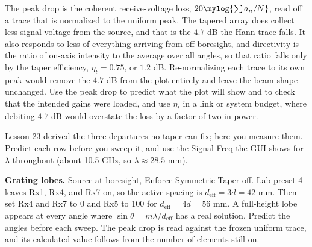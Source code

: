 \documentclass{exam}
\begin{document}
\begin{questions}
\begin{parts}
	\begin{solutionorlines}[2.6in]
	The peak drop is the coherent receive-voltage loss,
	$20\mylog{\sum a_n / N}$, read off a trace that is normalized to the uniform
	peak. The tapered array does collect less signal voltage from the source, and
	that is the $4.7$ dB the Hann trace falls. It also responds to less of
	everything arriving from off-boresight, and directivity is the ratio of
	on-axis intensity to the average over all angles, so that ratio falls only by
	the taper efficiency, $\eta_t = 0.75$, or $1.2$ dB. Re-normalizing each trace
	to its own peak would remove the $4.7$ dB from the plot entirely and leave the
	beam shape unchanged. Use the peak drop to predict what the plot will show and
	to check that the intended gains were loaded, and use $\eta_t$ in a link or
	system budget, where debiting $4.7$ dB would overstate the loss by a factor of
	two in power.
	\end{solutionorlines}

\end{parts}

\newpage
{}

Lesson 23 derived the three departures no taper can fix; here you measure them.
Predict each row before you sweep it, and use the Signal Freq the GUI shows for
$\lambda$ throughout (about 10.5 GHz, so $\lambda \approx 28.5$ mm).

\question \textbf{Grating lobes.} Source at boresight, Enforce Symmetric Taper
off. Lab preset 4 leaves Rx1, Rx4, and Rx7 on, so the active spacing is
$d_\text{eff} = 3d = 42$ mm. Then set Rx4 and Rx7 to 0 and Rx5 to 100 for
$d_\text{eff} = 4d = 56$ mm. A full-height lobe appears at every angle where
$\sin\theta = m\lambda/d_\text{eff}$ has a real solution. Predict the angles
before each sweep. The peak drop is read against the frozen uniform trace, and
its calculated value follows from the number of elements still on.


\end{questions}
\end{document}
